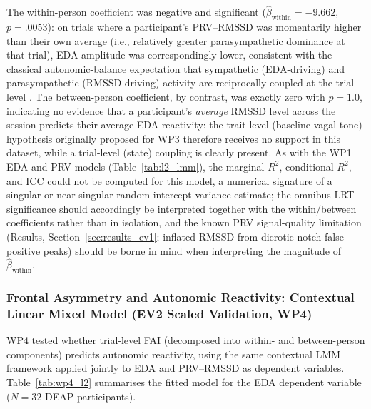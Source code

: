 The within-person coefficient was negative and significant ($\hat\beta_\text{within} = -9.662$, $p = .0053$): on trials where a participant's \gls{PRV}--\gls{RMSSD} was momentarily higher than their own average (i.e., relatively greater parasympathetic dominance at that trial), \gls{EDA} amplitude was correspondingly lower, consistent with the classical autonomic-balance expectation that sympathetic (\gls{EDA}-driving) and parasympathetic (\gls{RMSSD}-driving) activity are reciprocally coupled at the trial level \parencite{thayerRelationshipAutonomicImbalance2010}. The between-person coefficient, by contrast, was exactly zero with $p = 1.0$, indicating no evidence that a participant's \emph{average} \gls{RMSSD} level across the session predicts their average \gls{EDA} reactivity: the trait-level (baseline vagal tone) hypothesis originally proposed for WP3 therefore receives no support in this dataset, while a trial-level (state) coupling is clearly present. As with the WP1 EDA and \gls{PRV} models (Table~\ref{tab:l2_lmm}), the marginal $R^2$, conditional $R^2$, and \gls{ICC} could not be computed for this model, a numerical signature of a singular or near-singular random-intercept variance estimate; the omnibus LRT significance should accordingly be interpreted together with the within/between coefficients rather than in isolation, and the known \gls{PRV} signal-quality limitation (Results, Section~\ref{sec:results_ev1}; inflated \gls{RMSSD} from dicrotic-notch false-positive peaks) should be borne in mind when interpreting the magnitude of $\hat\beta_\text{within}$.

\subsubsection{Frontal Asymmetry and Autonomic Reactivity: Contextual Linear Mixed Model (EV2 Scaled Validation, WP4)}
\label{subsec:wp4_contextual}

WP4 tested whether trial-level \gls{FAI} (decomposed into within- and between-person components) predicts autonomic reactivity, using the same contextual \gls{LMM} framework applied jointly to \gls{EDA} and \gls{PRV}--\gls{RMSSD} as dependent variables. Table~\ref{tab:wp4_l2} summarises the fitted model for the \gls{EDA} dependent variable ($N = 32$ DEAP participants).

